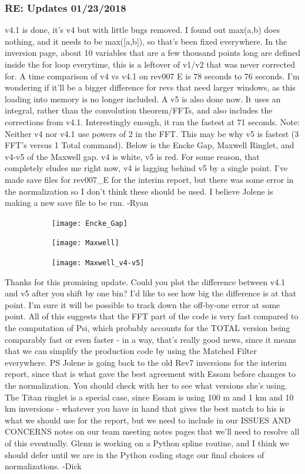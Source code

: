 \documentclass[crop=false,class=article,oneside]{standalone}
\begin{document}
\subsubsection{\footnotesize RE: Updates 01/23/2018}
v4.1 is done, it's v4 but with little bugs removed. I found out max(a,b) does nothing, and it needs to be max([a,b]), so that's been fixed everywhere. In the inversion page, about 10 variables that are a few thousand points long are defined inside the for loop everytime, this is a leftover of v1/v2 that was never corrected for. A time comparison of v4 vs v4.1 on rev007 E is 78 seconds to 76 seconds. I'm wondering if it'll be a bigger difference for revs that need larger windows, as this loading into memory is no longer included. A v5 is also done now. It uses an integral, rather than the convolution theorem/FFTs, and also includes the corrections from v4.1. Interestingly enough, it ran the fastest at 71 seconds. Note: Neither v4 nor v4.1 use powers of 2 in the FFT. This may be why v5 is fastest (3 FFT's versus 1 Total command). Below is the Encke Gap, Maxwell Ringlet, and v4-v5 of the Maxwell gap. v4 is white, v5 is red. For some reason, that completely eludes me right now, v4 is lagging behind v5 by a single point. I've made save files for rev007\_E for the interim report, but there was some error in the normalization so I don't think these should be used. I believe Jolene is making a new save file to be run. -Ryan
\begin{figure}[H]
    \centering
    \begin{subfigure}[b]{0.32\textwidth}
        \texttt{[image: Encke\_Gap]}
    \end{subfigure}
    \begin{subfigure}[b]{0.32\textwidth}
        \texttt{[image: Maxwell]}
    \end{subfigure}
    \begin{subfigure}[b]{0.32\textwidth}
        \texttt{[image: Maxwell\_v4-v5]}
    \end{subfigure}
\end{figure}
Thanks for this promising update. Could you plot the difference between v4.1 and v5 after you shift by one bin? I'd like to see how big the difference is at that point. I'm sure it will be possible to track down the off-by-one error at some point. 
All of this suggests that the FFT part of the code is very fast compared to the computation of Psi, which probably accounts for the TOTAL version being comparably fast or even faster - in a way, that's really good news, since it means that we can simplify the production code by using the Matched Filter everywhere. PS Jolene is going back to the old Rev7 inversions for the interim report, since that is what gave the best agreement with Essam before changes to the normalization. You should check with her to see what versions she's using. The Titan ringlet is a special case, since Essam is using 100 m and 1 km  and 10 km inversions - whatever you have in hand that gives the best match to his is what we should use for the report, but we need to include in our ISSUES AND CONCERNS notes on our team meeting notes pages that we'll need to resolve all of this eventually. Glenn is working on a Python spline routine, and I think we should defer until we are in the Python coding stage our final choices of normalizations. -Dick
\end{document}
